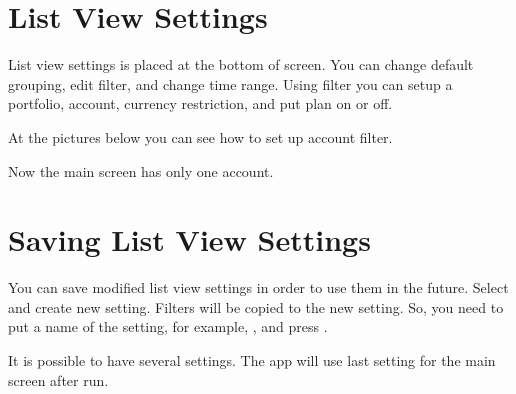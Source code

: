 \documentclass[a4paper,10pt,english]{sphinxmanual}
\begin{document}
\section{List View Settings}
\label{\detokenize{main-screen:list-view-settings}}
List view settings is placed at the bottom of screen. You can change default grouping,
edit filter, and change time range. Using filter you can setup a portfolio, account,
currency restriction, and put plan on or off.

At the pictures below you can see how to set up account filter.

\noindent{}

\noindent{}

\noindent{}

\noindent{}

\noindent{}

\noindent{}

Now the main screen has only one  account.


\section{Saving List View Settings}
\label{\detokenize{main-screen:saving-list-view-settings}}
You can save modified list view settings in order to use them in the future. Select
 and create new setting. Filters will be copied to the new setting.
So, you need to put a name of the setting, for example, , and
press .

\noindent{}

\noindent{}

It is possible to have several settings. The app will use last setting for the main screen
after run.
\end{document}

